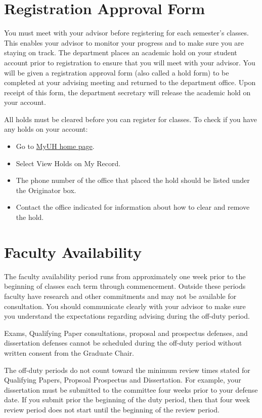 \documentclass[
]{book}
\providecommand{\tightlist}{%
  \setlength{\itemsep}{0pt}\setlength{\parskip}{0pt}}
\begin{document}
\section{Registration Approval Form}\label{registration-approval-form}

You must meet with your advisor before registering for each semester's classes. This enables your advisor to monitor your progress and to make sure you are staying on track. The department places an academic hold on your student account prior to registration to ensure that you will meet with your advisor. You will be given a registration approval form (also called a hold form) to be completed at your advising meeting and returned to the department office. Upon receipt of this form, the department secretary will release the academic hold on your account.

All holds must be cleared before you can register for classes. To check if you have any holds on your account:

\begin{itemize}
\tightlist
\item
  Go to \href{https://myuh.hawaii.edu/}{MyUH home page}.
\item
  Select View Holds on My Record.
\item
  The phone number of the office that placed the hold should be listed under the Originator box.
\item
  Contact the office indicated for information about how to clear and remove the hold.
\end{itemize}

\section{Faculty Availability}\label{faculty-availability}

The faculty availability period runs from approximately one week prior to the beginning of classes each term through commencement. Outside these periods faculty have research and other commitments and may not be available for consultation. You should communicate clearly with your advisor to make sure you understand the expectations regarding advising during the off-duty period.

Exams, Qualifying Paper consultations, proposal and prospectus defenses, and dissertation defenses cannot be scheduled during the off-duty period without written consent from the Graduate Chair.

The off-duty periods do not count toward the minimum review times stated for Qualifying Papers, Propsoal Prospectus and Dissertation. For example, your dissertation must be submitted to the committee four weeks prior to your defense date. If you submit prior the beginning of the duty period, then that four week review period does not start until the beginning of the review period.
\end{document}
